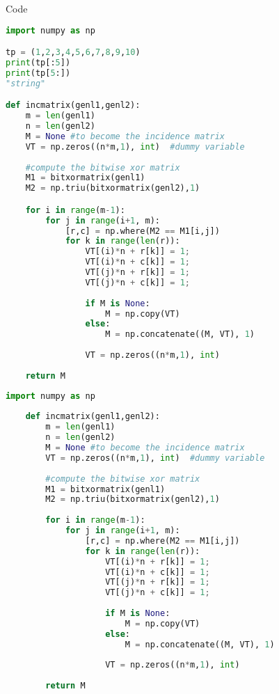 \documentclass{ctexart}
\renewcommand{\lstlistoflistings}{Code} %
\begin{document}
\tableofcontents
\lstlistoflistings%


\begin{lstlisting}[language=Python,caption=python code]
import numpy as np

tp = (1,2,3,4,5,6,7,8,9,10)
print(tp[:5])
print(tp[5:])
"string"

def incmatrix(genl1,genl2):
    m = len(genl1)
    n = len(genl2)
    M = None #to become the incidence matrix
    VT = np.zeros((n*m,1), int)  #dummy variable
    
    #compute the bitwise xor matrix
    M1 = bitxormatrix(genl1)
    M2 = np.triu(bitxormatrix(genl2),1) 

    for i in range(m-1):
        for j in range(i+1, m):
            [r,c] = np.where(M2 == M1[i,j])
            for k in range(len(r)):
                VT[(i)*n + r[k]] = 1;
                VT[(i)*n + c[k]] = 1;
                VT[(j)*n + r[k]] = 1;
                VT[(j)*n + c[k]] = 1;
                
                if M is None:
                    M = np.copy(VT)
                else:
                    M = np.concatenate((M, VT), 1)
                
                VT = np.zeros((n*m,1), int)
    
    return M
\end{lstlisting}

\begin{lstlisting}[language=Python,caption=python code]
    import numpy as np
        
    def incmatrix(genl1,genl2):
        m = len(genl1)
        n = len(genl2)
        M = None #to become the incidence matrix
        VT = np.zeros((n*m,1), int)  #dummy variable
        
        #compute the bitwise xor matrix
        M1 = bitxormatrix(genl1)
        M2 = np.triu(bitxormatrix(genl2),1) 
    
        for i in range(m-1):
            for j in range(i+1, m):
                [r,c] = np.where(M2 == M1[i,j])
                for k in range(len(r)):
                    VT[(i)*n + r[k]] = 1;
                    VT[(i)*n + c[k]] = 1;
                    VT[(j)*n + r[k]] = 1;
                    VT[(j)*n + c[k]] = 1;
                    
                    if M is None:
                        M = np.copy(VT)
                    else:
                        M = np.concatenate((M, VT), 1)
                    
                    VT = np.zeros((n*m,1), int)
        
        return M
\end{lstlisting}
\end{document}
